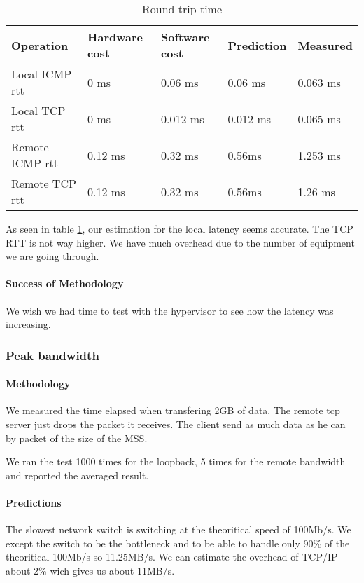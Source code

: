 \begin{table}[h]
\begin{center}
\begin{tabular}{| l | l | l | l | l |}
\hline
Operation 	& Hardware cost 	& Software cost 	& Prediction 		& Measured \\ \hline
Local ICMP rtt	& 0 ms	& 0.06 ms & 0.06 ms  & 0.063 ms	\\ \hline
Local TCP rtt	& 0 ms	& 0.012 ms & 0.012 ms	& 0.065 ms\\ \hline
Remote ICMP rtt	& 0.12 ms	& 0.32 ms & 0.56ms  & 1.253 ms\\ \hline
Remote TCP rtt	& 0.12 ms	& 0.32 ms & 0.56ms  & 1.26 ms	\\ \hline


\end{tabular}
\end{center}
\caption{Round trip time\label{tab:rtt}}
\end{table}

As seen in table \ref{tab:rtt}, our estimation for the local latency seems
accurate.
The TCP RTT is not way higher.
We have much overhead due to the number of equipment we are going through.

\paragraph{Success of Methodology}
We wish we had time to test with the hypervisor to see how the latency was
increasing.



\subsubsection{Peak bandwidth}
\paragraph{Methodology}
We measured the time elapsed when transfering 2GB of data.
The remote tcp server just drops the packet it receives.
The client send as much data as he can by packet of the size of the MSS.

We ran the test 1000 times for the loopback, 5 times for the remote bandwidth
and reported the averaged result.

\paragraph{Predictions}
The slowest network switch is switching at the theoritical speed of 100Mb/s.
We except the switch to be the bottleneck and to be able to handle only 90\% of
the theoritical 100Mb/s so 11.25MB/s.
We can estimate the overhead of TCP/IP about 2\% wich gives us about 11MB/s.

